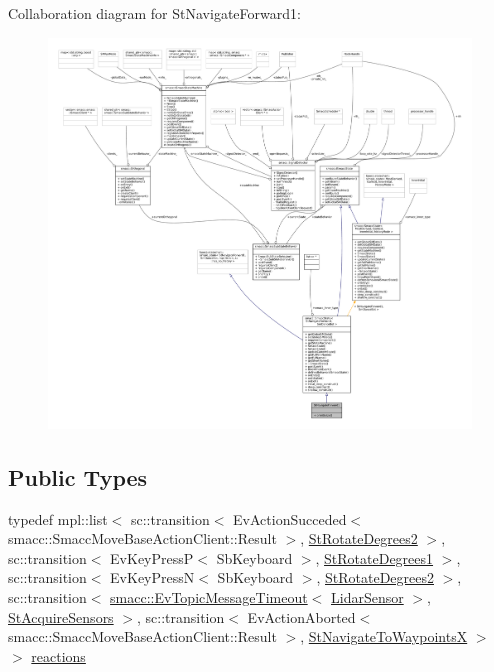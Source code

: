 Collaboration diagram for St\+Navigate\+Forward1\+:
\nopagebreak
\begin{figure}[H]
\begin{center}
\leavevmode
\includegraphics[width=350pt]{structStNavigateForward1__coll__graph}
\end{center}
\end{figure}
\subsection*{Public Types}
\begin{DoxyCompactItemize}
\item 
typedef mpl\+::list$<$ sc\+::transition$<$ Ev\+Action\+Succeded$<$ smacc\+::\+Smacc\+Move\+Base\+Action\+Client\+::\+Result $>$, \hyperlink{structStRotateDegrees2}{St\+Rotate\+Degrees2} $>$, sc\+::transition$<$ Ev\+Key\+PressP$<$ Sb\+Keyboard $>$, \hyperlink{structStRotateDegrees1}{St\+Rotate\+Degrees1} $>$, sc\+::transition$<$ Ev\+Key\+PressN$<$ Sb\+Keyboard $>$, \hyperlink{structStRotateDegrees2}{St\+Rotate\+Degrees2} $>$, sc\+::transition$<$ \hyperlink{structsmacc_1_1EvTopicMessageTimeout}{smacc\+::\+Ev\+Topic\+Message\+Timeout}$<$ \hyperlink{sensor__state_8h_a9db9e1944f88de79507758d08e4a2ee3}{Lidar\+Sensor} $>$, \hyperlink{structStAcquireSensors}{St\+Acquire\+Sensors} $>$, sc\+::transition$<$ Ev\+Action\+Aborted$<$ smacc\+::\+Smacc\+Move\+Base\+Action\+Client\+::\+Result $>$, \hyperlink{structStNavigateToWaypointsX}{St\+Navigate\+To\+WaypointsX} $>$ $>$ \hyperlink{structStNavigateForward1_aaa6938a29c73fbed24e45de85b5d9d25}{reactions}
\end{DoxyCompactItemize}
